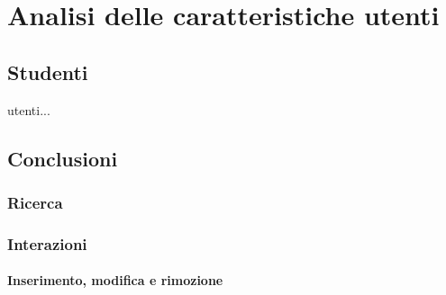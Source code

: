 \section{Analisi delle caratteristiche utenti}

\subsection{Studenti}
utenti...

\subsection{Conclusioni}

\subsubsection{Ricerca}

\subsubsection{Interazioni}
\paragraph{Inserimento, modifica e rimozione}

